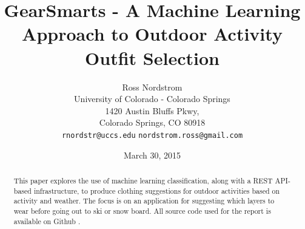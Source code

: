 \documentclass{sig-alternate}
\begin{document}
\title{GearSmarts - A Machine Learning Approach to Outdoor Activity Outfit Selection}
\author{Ross Nordstrom\\
        University of Colorado - Colorado Springs\\
        1420 Austin Bluffs Pkwy,\\
        Colorado Springs, CO 80918\\
        \texttt{rnordstr@uccs.edu}
        \texttt{nordstrom.ross@gmail.com}
       }
\date{March 30, 2015}

\maketitle

\begin{abstract}
This paper explores the use of machine learning classification, along with a REST API-based infrastructure, to
produce clothing suggestions for outdoor activities based on activity and weather. The focus is on an
application for suggesting which layers to wear before going out to ski or snow board. All source code used for the
report is available on Github \cite{repo}.
\end{abstract}






%




{}



\end{document}
